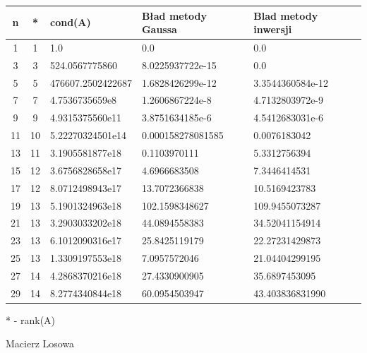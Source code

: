 \documentclass{article} %
\begin{document}
		\vspace{0.1cm}
		\begin{tabularx}{\textwidth}{|c|c|X|X|X|}
		\hline
		\textbf{n} & \textbf{*} & \textbf{cond(A)}  & \textbf{Bład metody Gaussa} & \textbf{Blad metody inwersji}\\ \hline
		1 & 1 & 1.0 & 0.0 & 0.0\\ \hline
		3 & 3 & 524.0567775860 & 8.0225937722e-15 & 0.0\\ \hline
		5 & 5 & 476607.2502422687 & 1.6828426299e-12 & 3.3544360584e-12\\ \hline
		7 & 7 & 4.7536735659e8 & 1.2606867224e-8 & 4.7132803972e-9\\ \hline
		9 & 9 & 4.9315375560e11 & 3.8751634185e-6 & 4.5412683031e-6\\ \hline
		11 & 10 & 5.22270324501e14 & 0.000158278081585 & 0.0076183042\\ \hline
		13 & 11 & 3.1905581877e18 & 0.1103970111 & 5.3312756394\\ \hline
		15 & 12 & 3.6756828658e17 & 4.6966683508 & 7.3446414531\\ \hline
		17 & 12 & 8.0712498943e17 & 13.7072366838 & 10.5169423783\\ \hline
		19 & 13 & 5.1901324963e18 & 102.1598348627 & 109.9455073287\\ \hline
		21 & 13 & 3.2903033202e18 & 44.0894558383 & 34.52041154914\\ \hline
		23 & 13 & 6.1012090316e17 & 25.8425119179 & 22.27231429873\\ \hline
		25 & 13 & 1.3309197553e18 & 7.0957572046 & 21.04404299195\\ \hline
		27 & 14 & 4.2868370216e18 & 27.4330900905 & 35.6897453095\\ \hline
		29 & 14 & 8.2774340844e18 & 60.0954503947 & 43.403836831990\\ \hline
		\end{tabularx}
		* - rank(A)
		\vspace{5cm}
		
		Macierz Losowa
\end{document}
